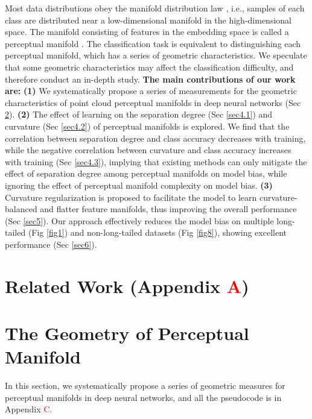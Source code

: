 \documentclass[10pt,twocolumn,letterpaper]{article}
\begin{document}
Most data distributions obey the manifold distribution law \cite{paper48,paper49}, i.e., samples of each class are distributed near a low-dimensional manifold in the high-dimensional space. The manifold consisting of features in the embedding space is called a perceptual manifold \cite{paper50}. The classification task is equivalent to distinguishing each perceptual manifold, which has a series of geometric characteristics. We speculate that some geometric characteristics may affect the classification difficulty, and therefore conduct an in-depth study. \textbf{The main contributions of our work are:} \textbf{(1)} We systematically propose a series of measurements for the geometric characteristics of point cloud perceptual manifolds in deep neural networks (Sec \ref{sec3}). \textbf{(2)} The effect of learning on the separation degree (Sec \ref{sec4.1}) and curvature (Sec \ref{sec4.2}) of perceptual manifolds is explored. We find that the correlation between separation degree and class accuracy decreases with training, while the negative correlation between curvature and class accuracy increases with training (Sec \ref{sec4.3}), implying that existing methods can only mitigate the effect of separation degree among perceptual manifolds on model bias, while ignoring the effect of perceptual manifold complexity on model bias. \textbf{(3)} Curvature regularization is proposed to facilitate the model to learn curvature-balanced and flatter feature manifolds, thus improving the overall performance (Sec \ref{sec5}). Our approach effectively reduces the model bias on multiple long-tailed (Fig \ref{fig1}) and non-long-tailed datasets (Fig \ref{fig8}), showing excellent performance (Sec \ref{sec6}).

\section{Related Work (Appendix \textcolor{red}{A})}



\section{The Geometry of Perceptual Manifold}
\label{sec3}
In this section, we systematically propose a series of geometric measures for perceptual manifolds in deep neural networks, and all the pseudocode is in Appendix \textcolor{red}{C}.
\end{document}
